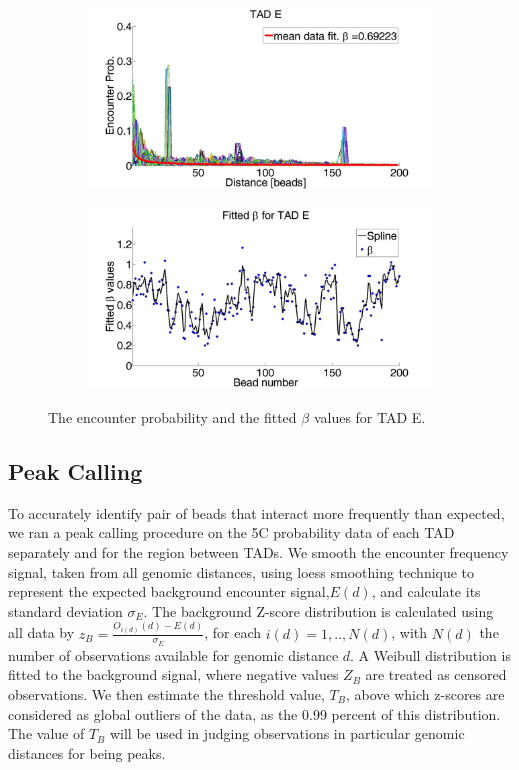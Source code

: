 \documentclass[12pt]{article}
\begin{document}
\begin{figure}[H]
 \begin{subfigure}[b]{0.3\textwidth}
 \includegraphics[scale=0.2]{meanDataFitTADE}
 \caption{}
 \end{subfigure}
 
 \begin{subfigure}[b]{0.3\textwidth}
\includegraphics[scale=0.2]{fittedExpValuesWithSplineAverageTADE}
\caption{}
 \end{subfigure}
\caption{The encounter probability and the fitted $\beta$ values for TAD E.}
\end{figure}
\subsection{Peak Calling}

To accurately identify pair of beads that interact more frequently than expected, we ran a peak calling procedure on the 5C probability data of each TAD separately and for the region between TADs. We smooth the encounter frequency signal, taken from all genomic distances, using loess smoothing technique to represent the expected background encounter signal,$E(d)$, and calculate its standard deviation $\sigma_E$. The background Z-score distribution is calculated using all data by $z_B=\frac{O_{i(d)}(d)-E(d)}{\sigma_E}$, for each $i(d)=1,..,N(d)$, with $N(d)$ the number of observations available for genomic distance $d$. A Weibull distribution is fitted to the background signal, where negative values $Z_B$ are treated as censored observations. We then estimate the threshold value, $T_B$, above which z-scores are considered as global outliers of the data, as the 0.99 percent of this distribution. The value of $T_B$ will be used in judging observations in particular genomic distances for being peaks.
\end{document}
